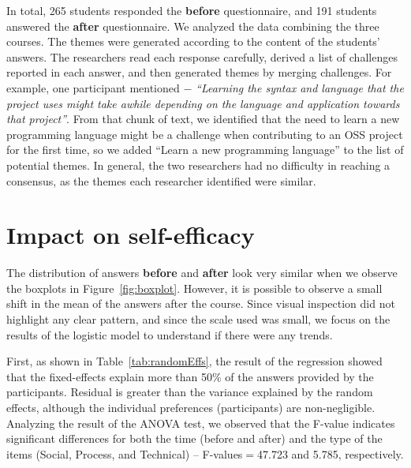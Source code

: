 \documentclass[sigconf]{acmart}
\begin{document}
\begin{sloppy}
In total, 265 students responded the \textbf{before} questionnaire, and 191 students answered the \textbf{after} questionnaire. We analyzed the data combining the three courses. The themes were generated according to the content of the students' answers. The researchers read each response carefully, derived a list of challenges reported in each answer, and then generated themes by merging challenges. For example, one participant mentioned $-$ \textit{``Learning the syntax and language that the project uses might take awhile depending on the language and application towards that project''}. From that chunk of text, we identified that the need to learn a new programming language might be a challenge when contributing to an OSS project for the first time, so we added ``Learn a new programming language'' to the list of potential themes. In general, the two researchers had no difficulty in reaching a consensus, as the themes each researcher identified were similar.


\section{Impact on self-efficacy} 

The distribution of answers \textbf{before} and \textbf{after} look very similar when we observe the boxplots in Figure~\ref{fig:boxplot}. However, it is possible to observe a small shift in the mean of the answers after the course. Since visual inspection did not highlight any clear pattern, and since the scale used was small, we focus on the results of the logistic model to understand if there were any trends.

First, as shown in Table~\ref{tab:randomEffs}, the result of the regression showed that the fixed-effects explain more than 50\% of the answers provided by the participants. Residual is greater than the variance explained by the random effects, although the individual preferences (participants) are non-negligible. Analyzing the result of the ANOVA test, we observed that the F-value indicates significant differences for both the time (before and after) and the type of the items (Social, Process, and Technical) -- F-values$=$47.723 and 5.785, respectively.


\end{sloppy}
\end{document}
